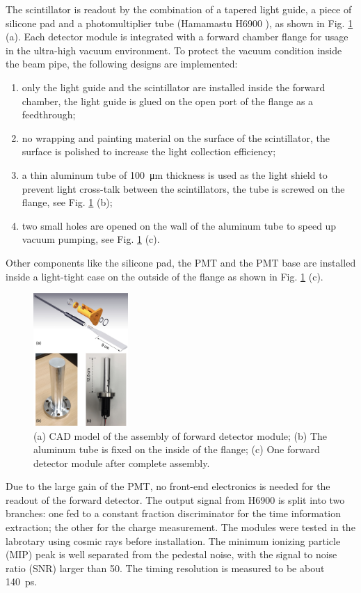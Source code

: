 \documentclass[number,5p]{elsarticle}
\begin{document}
The scintillator is readout by the combination of a tapered light guide, a piece of silicone pad and a
photomultiplier tube (Hamamastu H6900 \cite{hamamatsu}), as shown in Fig. \ref{fig:forward_module} (a).
Each detector module is integrated with a forward chamber flange for usage
in the ultra-high vacuum environment.
To protect the vacuum condition inside the beam pipe, the following designs are implemented:
\begin{enumerate}
\item only the light guide and the scintillator are installed inside the forward chamber, the light guide is glued on the open port of the flange as a feedthrough;
\item no wrapping and painting material on the surface of the scintillator, the
  surface is polished to increase the light collection efficiency;
\item a thin aluminum tube of \SI{100}{\micro\meter} thickness is used as
  the light shield to prevent light cross-talk between the scintillators, the tube is screwed on the flange, see Fig. \ref{fig:forward_module} (b);
\item two small holes are opened on the wall of the aluminum tube to speed up vacuum pumping, see Fig. \ref{fig:forward_module} (c).
\end{enumerate}
Other components like the silicone pad, the PMT and the PMT base are installed inside a light-tight case on the outside of the flange as shown in Fig. \ref{fig:forward_module} (c).
\begin{figure}[htbp]
  \centering
  \includegraphics[width=0.32\textwidth]{./forward_module.png}
  \caption{(a) CAD model of the assembly of forward detector module; (b) The aluminum tube is fixed on the inside of the flange; (c) One forward detector module after complete assembly.}
  \label{fig:forward_module}
\end{figure}

Due to the large gain of the PMT, no front-end electronics is needed for the readout of the forward detector.
The output signal from H6900 is split into two branches: one fed to a
constant fraction discriminator for the time information extraction; the other
for the charge measurement.
The modules were tested in the labrotary using cosmic rays before installation.
The minimum ionizing particle (MIP) peak is well separated from the pedestal
noise, with the signal to noise ratio (SNR) larger than 50.
The timing resolution is measured to be about \SI{140}{\pico\second}.
\end{document}
